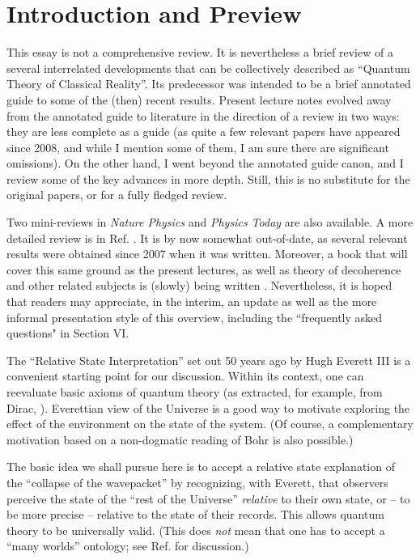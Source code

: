 \documentclass[aps,amsmath,amssymb,amsfonts,12pt]{revtex4-1}
\newcommand{\+}         {\dagger}
\begin{document}
\section{Introduction and Preview}

This essay is not a comprehensive review. It is nevertheless a brief review of a several interrelated developments that can be collectively described as ``Quantum Theory of Classical Reality''.
Its predecessor %
was intended to be a brief  annotated guide to some of the (then) recent results. 
Present lecture notes evolved away from the annotated guide to literature in the direction of a review in two ways: they are less complete as a guide (as quite a few relevant papers have appeared since 2008, and while I mention some of them, I am sure there are significant omissions). On the other hand, I went beyond the annotated guide canon, and I review some of the key advances in more depth. Still, this is no substitute for the original papers, or for a fully fledged review. 

Two mini-reviews in {\it Nature Physics} \cite{ZurekNatPhys} and {\it Physics Today} \cite{ZurekPT} are also available. A more detailed review is in Ref. \cite{Z07a}. It is by now somewhat out-of-date, as several relevant results were obtained since 2007 when it was written. Moreover, a book that will cover this same ground as the present lectures, as well as theory of decoherence and other related subjects is (slowly) being written \cite{Zurekbook}. Nevertheless, it is hoped that readers may appreciate, in the interim,  an update as well as the more informal presentation style of this overview, including the ``frequently asked questions" in Section VI.

The  ``Relative State Interpretation'' set out 50 years ago by Hugh
Everett III \cite{25,26} is a convenient starting point for our discussion. Within its context, one can reevaluate basic axioms of quantum theory (as extracted, for example, from
Dirac, \cite{23}). Everettian view of the Universe is a good way to motivate exploring the effect of the environment
on the state of the system. (Of course, a complementary motivation based on a non-dogmatic
reading of Bohr \cite{11} is also possible.)

The basic idea we shall pursue here is to accept a relative state explanation of the  ``collapse of the
wavepacket'' by recognizing, with Everett, that observers perceive the state of the ``rest of the Universe''
{\it relative} to their own state, or -- to be more precise -- relative to the state of their records.
This allows quantum theory to be universally valid. (This does {\it not} mean that one has to accept
a ``many worlds'' ontology; see Ref. \cite{Z07a} for discussion.)
\end{document}
